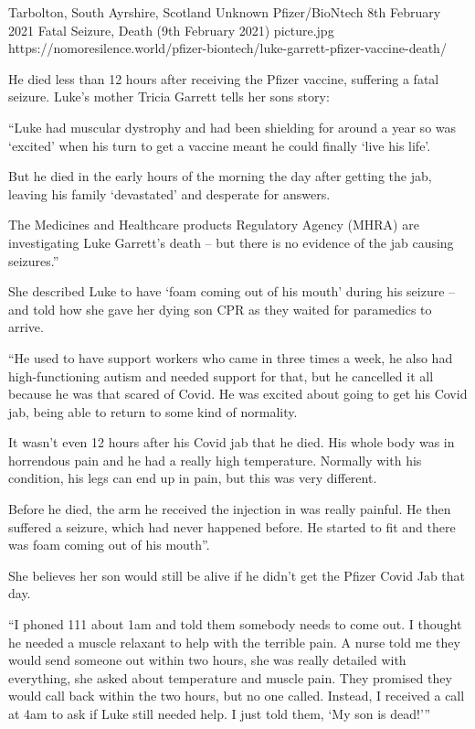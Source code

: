 {Tarbolton, South Ayrshire, Scotland}
{Unknown}
{Pfizer/BioNtech}
{8th February 2021}
{Fatal Seizure, Death (9th February 2021)}
{picture.jpg}
{https://nomoresilence.world/pfizer-biontech/luke-garrett-pfizer-vaccine-death/}
{

He died less than 12 hours after receiving the Pfizer vaccine, suffering a fatal
seizure. Luke’s mother Tricia Garrett tells her sons story:

“Luke had muscular dystrophy and had been shielding for around a year so was
‘excited’ when his turn to get a vaccine meant he could finally ‘live his life’.

But he died in the early hours of the morning the day after getting the jab,
leaving his family ‘devastated’ and desperate for answers.

The Medicines and Healthcare products Regulatory Agency (MHRA) are investigating
Luke Garrett’s death – but there is no evidence of the jab causing seizures.”

She described Luke to have ‘foam coming out of his mouth’ during his seizure –
and told how she gave her dying son CPR as they waited for paramedics to arrive.

“He used to have support workers who came in three times a week, he also had
high-functioning autism and needed support for that, but he cancelled it all
because he was that scared of Covid. He was excited about going to get his Covid
jab, being able to return to some kind of normality.

It wasn’t even 12 hours after his Covid jab that he died. His whole body was in
horrendous pain and he had a really high temperature. Normally with his
condition, his legs can end up in pain, but this was very different.

Before he died, the arm he received the injection in was really painful. He then
suffered a seizure, which had never happened before. He started to fit and there
was foam coming out of his mouth”.

She believes her son would still be alive if he didn’t get the Pfizer Covid Jab
that day.

“I phoned 111 about 1am and told them somebody needs to come out. I thought he
needed a muscle relaxant to help with the terrible pain. A nurse told me they
would send someone out within two hours, she was really detailed with
everything, she asked about temperature and muscle pain. They promised they
would call back within the two hours, but no one called. Instead, I received a
call at 4am to ask if Luke still needed help. I just told them, ‘My son is
dead!'”

}
